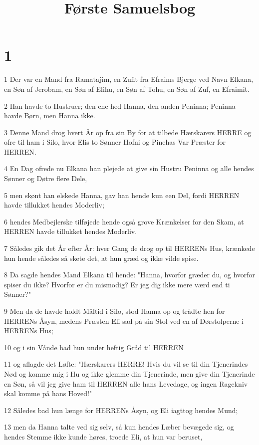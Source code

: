 

\title{Første Samuelsbog}


\chapter{1}

\par 1 Der var en Mand fra Ramatajim, en Zufit fra Efraims Bjerge ved Navn Elkana, en Søn af Jerobam, en Søn af Elihu, en Søn af Tohu, en Søn af Zuf, en Efraimit.
\par 2 Han havde to Hustruer; den ene hed Hanna, den anden Peninna; Peninna havde Børn, men Hanna ikke.
\par 3 Denne Mand drog hvert År op fra sin By for at tilbede Hærskarers HERRE og ofre til ham i Silo, hvor Elis to Sønner Hofni og Pinehas Var Præster for HERREN.
\par 4 En Dag ofrede nu Elkana han plejede at give sin Hustru Peninna og alle hendes Sønner og Døtre flere Dele,
\par 5 men skønt han elskede Hanna, gav han hende kun een Del, fordi HERREN havde tillukket hendes Moderliv;
\par 6 hendes Medbejlerske tilføjede hende også grove Krænkelser for den Skam, at HERREN havde tillukket hendes Moderliv.
\par 7 Således gik det År efter År: hver Gang de drog op til HERRENs Hus, krænkede hun hende således så skete det, at hun græd og ikke vilde spise.
\par 8 Da sagde hendes Mand Elkana til hende: "Hanna, hvorfor græder du, og hvorfor spiser du ikke? Hvorfor er du mismodig? Er jeg dig ikke mere værd end ti Sønner?"
\par 9 Men da de havde holdt Måltid i Silo, stod Hanna op og trådte hen for HERRENs Åsyn, medens Præsten Eli sad på sin Stol ved en af Dørstolperne i HERRENs Hus;
\par 10 og i sin Vånde bad hun under heftig Gråd til HERREN
\par 11 og aflagde det Løfte: "Hærskarers HERRE! Hvis du vil se til din Tjenerindes Nød og komme mig i Hu og ikke glemme din Tjenerinde, men give din Tjenerinde en Søn, så vil jeg give ham til HERREN alle hans Levedage, og ingen Ragekniv skal komme på hans Hoved!"
\par 12 Således bad hun længe for HERRENs Åsyn, og Eli iagttog hendes Mund;
\par 13 men da Hanna talte ved sig selv, så kun hendes Læber bevægede sig, og hendes Stemme ikke kunde høres, troede Eli, at hun var beruset,
